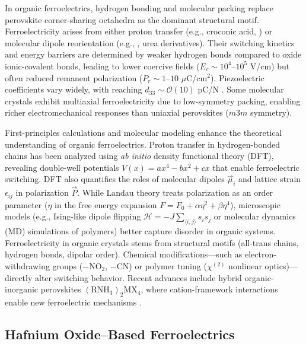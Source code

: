 \documentclass[a4paper,fleqn]{cas-sc}
\begin{document}
\par In organic ferroelectrics, hydrogen bonding and molecular packing replace perovskite corner-sharing octahedra as the dominant structural motif. Ferroelectricity arises from either proton transfer (e.g., croconic acid, ) or molecular dipole reorientation (e.g., , urea derivatives). Their switching kinetics and energy barriers are determined by weaker hydrogen bonds compared to oxide ionic-covalent bonds, leading to lower coercive fields ($E_c \sim 10^4$--$10^5$ V/cm) but often reduced remanent polarization ($P_r \sim 1$--$10$ $\mu$C/cm$^2$). Piezoelectric coefficients vary widely, with  reaching $d_{33} \sim \mathcal{O}(10)$ pC/N \cite{Fu2013}. Some molecular crystals exhibit multiaxial ferroelectricity due to low-symmetry packing, enabling richer electromechanical responses than uniaxial perovskites ($m3m$ symmetry).
\par First-principles calculations and molecular modeling enhance the theoretical understanding of organic ferroelectrics. Proton transfer in hydrogen-bonded chains has been analyzed using \textit{ab initio} density functional theory (DFT), revealing double-well potentials $V(x) = ax^4 - bx^2 + cx$ that enable ferroelectric switching. DFT also quantifies the roles of molecular dipoles $\vec{\mu}_i$ and lattice strain $\epsilon_{ij}$ in polarization $\vec{P}$. While Landau theory treats polarization as an order parameter ($\eta$ in the free energy expansion $F = F_0 + \alpha\eta^2 + \beta\eta^4$), microscopic models (e.g., Ising-like dipole flipping $\mathcal{H} = -J\sum_{\langle i,j\rangle} s_i s_j$ or molecular dynamics (MD) simulations of polymers) better capture disorder in organic systems. Ferroelectricity in organic crystals stems from structural motifs (all-trans chains, hydrogen bonds, dipolar order). Chemical modifications---such as electron-withdrawing groups ($\mathrm{-NO_2}$, $\mathrm{-CN}$) or polymer tuning ($\chi^{(2)}$ nonlinear optics)---directly alter switching behavior. Recent advances include hybrid organic-inorganic perovskites $\mathrm{(RNH_3)_2MX_4}$, where cation-framework interactions enable new ferroelectric mechanisms \cite{mohapatra2021organic}.

\subsection*{Hafnium Oxide–Based Ferroelectrics}
\end{document}
